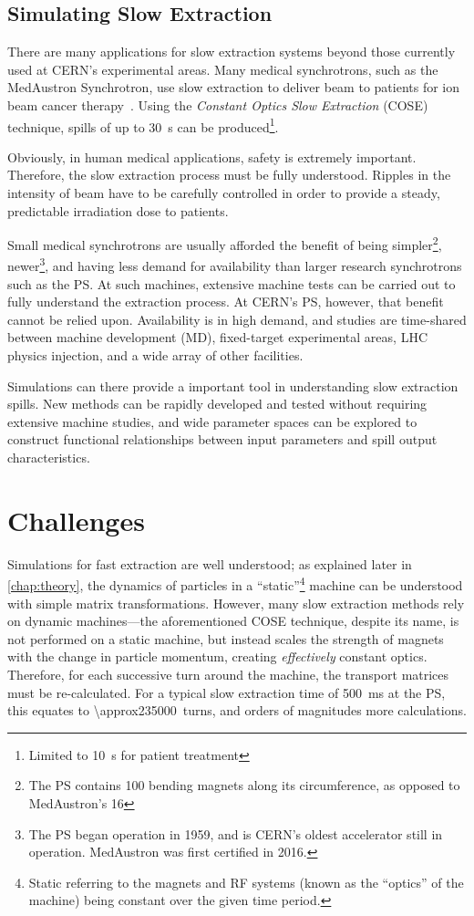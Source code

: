 \documentclass[11pt]{report}
\begin{document}
\subsection{Simulating Slow Extraction}

There are many applications for slow extraction systems beyond those currently used at CERN's experimental areas. Many medical synchrotrons, such as the MedAustron Synchrotron, use slow extraction to deliver beam to patients for ion beam cancer therapy~\cite{ArrutiaSota:2845862}. Using the \textit{Constant Optics Slow Extraction} (COSE) technique, spills of up to \qty{30}{\second} can be produced\footnote{Limited to \qty{10}{\second} for patient treatment}.

Obviously, in human medical applications, safety is extremely important. Therefore, the slow extraction process must be fully understood. Ripples in the intensity of beam have to be carefully controlled in order to provide a steady, predictable irradiation dose to patients.

Small medical synchrotrons are usually afforded the benefit of being simpler\footnote{The PS contains 100 bending magnets along its circumference, as opposed to MedAustron's 16}, newer\footnote{The PS began operation in 1959, and is CERN's oldest accelerator still in operation. MedAustron was first certified in 2016.}, and having less demand for availability than larger research synchrotrons such as the PS. At such machines, extensive machine tests can be carried out to fully understand the extraction process. At CERN's PS, however, that benefit cannot be relied upon. Availability is in high demand, and studies are time-shared between machine development (MD), fixed-target experimental areas, LHC physics injection, and a wide array of other facilities. 

Simulations can there provide a important tool in understanding slow extraction spills. New methods can be rapidly developed and tested without requiring extensive machine studies, and wide parameter spaces can be explored to construct functional relationships between input parameters and spill output characteristics. 

\section{Challenges}

Simulations for fast extraction are well understood; as explained later in \autoref{chap:theory}, the dynamics of particles in a ``static''\footnote{Static referring to the magnets and RF systems (known as the ``optics'' of the machine) being constant over the given time period.} machine can be understood with simple matrix transformations. However, many slow extraction methods rely on dynamic machines---the aforementioned COSE technique, despite its name, is not performed on a static machine, but instead scales the strength of magnets with the change in particle momentum, creating \textit{effectively} constant optics. Therefore, for each successive turn around the machine, the transport matrices must be re-calculated. For a typical slow extraction time of \qty{500}{\milli\second} at the PS, this equates to \qty{\approx235000}{turns}, and orders of magnitudes more calculations.
\end{document}
